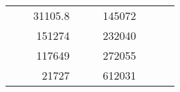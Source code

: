 \begin{table}[H]
\begin{tabular}{|ccrccrccc}
\multicolumn{1}{|c|}{\cellcolor[HTML]{FFFFC7}}                                & \multicolumn{1}{c|}{\cellcolor[HTML]{DDFDFF}}                      & \multicolumn{1}{r|}{\cellcolor[HTML]{DAE8FC}31105.8}   & \multicolumn{1}{c|}{\cellcolor[HTML]{FFFFC7}}                                & \multicolumn{1}{c|}{\cellcolor[HTML]{DDFDFF}}                       & \multicolumn{1}{r|}{\cellcolor[HTML]{DDFDFF}145072}    &                                                                              &                                                                    &                                                        \\ \cline{3-3} \cline{6-6}
\multicolumn{1}{|c|}{\cellcolor[HTML]{FFFFC7}}                                & \multicolumn{1}{c|}{\cellcolor[HTML]{DDFDFF}}                      & \multicolumn{1}{r|}{\cellcolor[HTML]{DDFDFF}151274}    & \multicolumn{1}{c|}{\cellcolor[HTML]{FFFFC7}}                                & \multicolumn{1}{c|}{\cellcolor[HTML]{DDFDFF}}                       & \multicolumn{1}{r|}{\cellcolor[HTML]{DAE8FC}232040}    &                                                                              &                                                                    &                                                        \\ \cline{3-3} \cline{6-6}
\multicolumn{1}{|c|}{\cellcolor[HTML]{FFFFC7}}                                & \multicolumn{1}{c|}{\cellcolor[HTML]{DDFDFF}}                      & \multicolumn{1}{r|}{\cellcolor[HTML]{DAE8FC}117649}    & \multicolumn{1}{c|}{\cellcolor[HTML]{FFFFC7}}                                & \multicolumn{1}{c|}{\cellcolor[HTML]{DDFDFF}}                       & \multicolumn{1}{r|}{\cellcolor[HTML]{DDFDFF}272055}    &                                                                              &                                                                    &                                                        \\ \cline{3-3} \cline{6-6}
\multicolumn{1}{|c|}{\cellcolor[HTML]{FFFFC7}}                                & \multicolumn{1}{c|}{\cellcolor[HTML]{DDFDFF}}                      & \multicolumn{1}{r|}{\cellcolor[HTML]{DDFDFF}21727}     & \multicolumn{1}{c|}{\cellcolor[HTML]{FFFFC7}}                                & \multicolumn{1}{c|}{\cellcolor[HTML]{DDFDFF}}                       & \multicolumn{1}{r|}{\cellcolor[HTML]{DAE8FC}612031}    &                                                                              &                                                                    &                                                        \\ \cline{3-3} \cline{6-6}

\end{tabular}
\end{table}
